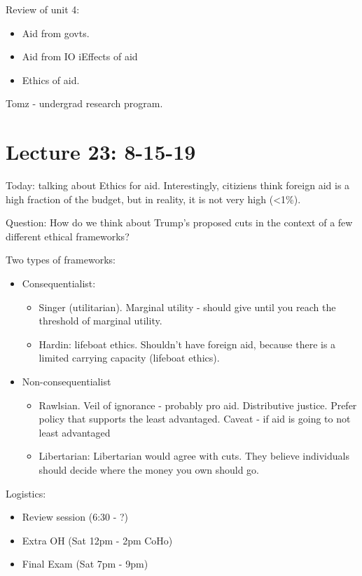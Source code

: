 \documentclass{article}
\begin{document}
Review of unit 4:
\begin{itemize}
  \item Aid from govts.
  \item Aid from IO
    iEffects of aid
  \item Ethics of aid.
\end{itemize}

Tomz - undergrad research program.

\section{Lecture 23: 8-15-19}

Today: talking about Ethics for aid.  Interestingly, citiziens think foreign aid is a high fraction of the budget, but in reality, it is not very high (<1\%).

Question: How do we think about Trump's proposed cuts in the context of a few different ethical frameworks?

Two types of frameworks:
\begin{itemize}
  \item Consequentialist:
    \begin{itemize}
      \item Singer (utilitarian).  Marginal utility - should give until you reach the threshold of marginal utility.

      \item Hardin: lifeboat ethics. Shouldn't have foreign aid, because there is a limited carrying capacity (lifeboat ethics).
    \end{itemize}
  \item Non-consequentialist
    \begin{itemize}
      \item Rawlsian.  Veil of ignorance - probably pro aid.  Distributive justice.  Prefer policy that supports the least advantaged.  Caveat - if aid is going to not least advantaged

      \item Libertarian: Libertarian would agree with cuts.  They believe individuals should decide where the money you own should go.
    \end{itemize}
\end{itemize}



Logistics:
\begin{itemize}
  \item Review session (6:30 - ?)
  \item Extra OH (Sat 12pm - 2pm CoHo)
  \item Final Exam (Sat 7pm - 9pm)
\end{itemize}
\end{document}
